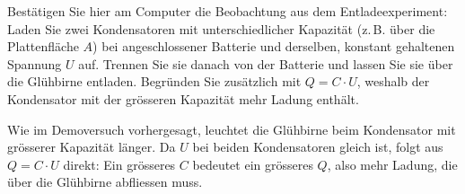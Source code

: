 \documentclass[addpoints,11pt,a4paper]{exam}
\newlength{\antwortraumlen}
\newcommand{\Antwortraum}[1]{%
  \pgfmathsetlength{\antwortraumlen}{#1*2.5cm}%
  \begin{answerbox}
    \rule{0pt}{\antwortraumlen}%
  \end{answerbox}%
}
\begin{document}
\begin{questions}
\begin{groupbox}
Bestätigen Sie hier am Computer die Beobachtung aus dem
Entladeexperiment: Laden Sie zwei Kondensatoren mit unterschiedlicher
Kapazität (z.\,B. über die Plattenfläche $A$) bei angeschlossener Batterie
und derselben, konstant gehaltenen Spannung $U$ auf. Trennen Sie sie
danach von der Batterie und lassen Sie sie über die Glühbirne entladen.
Begründen Sie zusätzlich mit $Q=C\cdot U$, weshalb der Kondensator mit der
grösseren Kapazität mehr Ladung enthält.
\Antwortraum{3}
\begin{solution}
Wie im Demoversuch vorhergesagt, leuchtet die Glühbirne beim Kondensator
mit grösserer Kapazität länger. Da $U$ bei beiden Kondensatoren gleich
ist, folgt aus $Q=C\cdot U$ direkt: Ein grösseres $C$ bedeutet ein
grösseres $Q$, also mehr Ladung, die über die Glühbirne abfliessen muss.
\end{solution}
\end{groupbox}
\end{questions}
\end{document}
